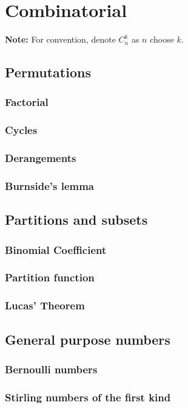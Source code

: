 \chapter{Combinatorial}
\textbf{Note: } For convention, denote $C^k_n$ as $n$ choose $k$.

\section{Permutations}
	\subsection{Factorial}
		
	\subsection{Cycles}
		
	\subsection{Derangements}
		
	\subsection{Burnside's lemma}
		
\section{Partitions and subsets}
	\subsection{Binomial Coefficient}
		
	\subsection{Partition function}
		
	\subsection{Lucas' Theorem}
		
\section{General purpose numbers}
	\subsection{Bernoulli numbers}
		
	\subsection{Stirling numbers of the first kind}
		
